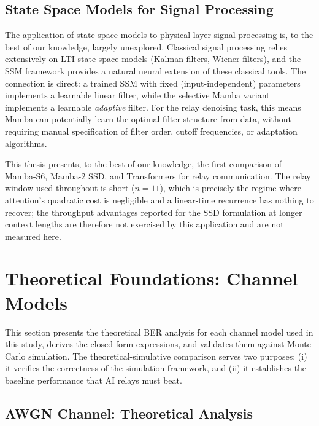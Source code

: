 \subsection{State Space Models for Signal Processing}\label{sec:state-space-models-for-signal-processing}

The application of state space models to physical-layer signal processing is, to the best of our knowledge, largely unexplored. Classical signal processing relies extensively on LTI state space models (Kalman filters, Wiener filters), and the SSM framework provides a natural neural extension of these classical tools. The connection is direct: a trained SSM with fixed (input-independent) parameters implements a learnable linear filter, while the selective Mamba variant implements a learnable \emph{adaptive} filter. For the relay denoising task, this means Mamba can potentially learn the optimal filter structure from data, without requiring manual specification of filter order, cutoff frequencies, or adaptation algorithms.

This thesis presents, to the best of our knowledge, the first comparison of Mamba-S6, Mamba-2 SSD, and Transformers for relay communication. The relay window used throughout is short ($n=11$), which is precisely the regime where attention's quadratic cost is negligible and a linear-time recurrence has nothing to recover; the throughput advantages reported for the SSD formulation at longer context lengths \cite{DaoGu2024TransformersSSM} are therefore not exercised by this application and are not measured here.

\section{Theoretical Foundations: Channel Models}\label{sec:theoretical-foundations-channel-models}

This section presents the theoretical BER analysis for each channel model used in this study, derives the closed-form expressions, and validates them against Monte Carlo simulation. The theoretical-simulative comparison serves two purposes: (i) it verifies the correctness of the simulation framework, and (ii) it establishes the baseline performance that AI relays must beat.

\subsection{AWGN Channel: Theoretical Analysis}\label{sec:awgn-channel-theoretical-analysis}

